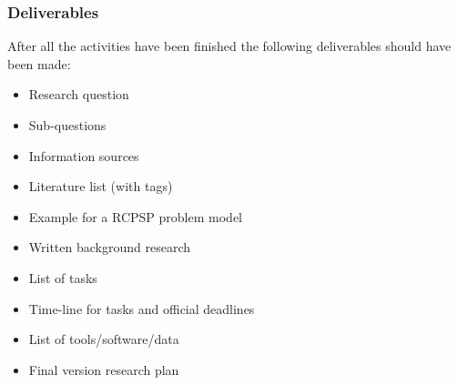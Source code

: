 \documentclass[english]{article}
\begin{document}
\subsubsection{Deliverables}
After all the activities have been finished the following deliverables should have been made:
{\begin{itemize}
    \item Research question
    \item Sub-questions
    \item Information sources
    \item Literature list (with tags)
    \item Example for a RCPSP problem model
    \item Written background research
    \item List of tasks
    \item Time-line for tasks and official deadlines
    \item List of tools/software/data
    \item Final version research plan
\end{itemize}{}}
\end{document}
